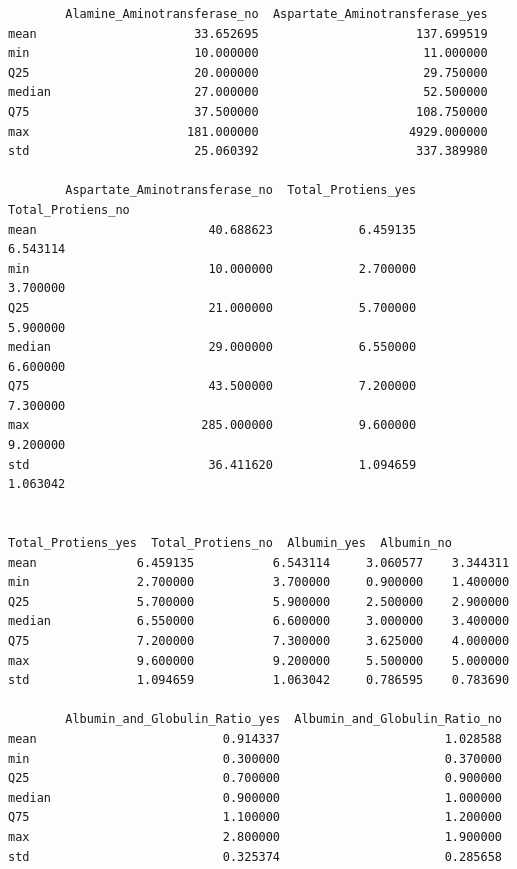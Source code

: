 \documentclass[
  11pt,
  a4paper,
]{article}
\begin{document}
\begin{verbatim}
        Alamine_Aminotransferase_no  Aspartate_Aminotransferase_yes  
mean                      33.652695                      137.699519   
min                       10.000000                       11.000000   
Q25                       20.000000                       29.750000   
median                    27.000000                       52.500000   
Q75                       37.500000                      108.750000   
max                      181.000000                     4929.000000   
std                       25.060392                      337.389980   

        Aspartate_Aminotransferase_no  Total_Protiens_yes  Total_Protiens_no  
mean                        40.688623            6.459135           6.543114   
min                         10.000000            2.700000           3.700000   
Q25                         21.000000            5.700000           5.900000   
median                      29.000000            6.550000           6.600000   
Q75                         43.500000            7.200000           7.300000   
max                        285.000000            9.600000           9.200000   
std                         36.411620            1.094659           1.063042 


Total_Protiens_yes  Total_Protiens_no  Albumin_yes  Albumin_no  
mean              6.459135           6.543114     3.060577    3.344311   
min               2.700000           3.700000     0.900000    1.400000   
Q25               5.700000           5.900000     2.500000    2.900000   
median            6.550000           6.600000     3.000000    3.400000   
Q75               7.200000           7.300000     3.625000    4.000000   
max               9.600000           9.200000     5.500000    5.000000   
std               1.094659           1.063042     0.786595    0.783690   

        Albumin_and_Globulin_Ratio_yes  Albumin_and_Globulin_Ratio_no  
mean                          0.914337                       1.028588  
min                           0.300000                       0.370000  
Q25                           0.700000                       0.900000  
median                        0.900000                       1.000000  
Q75                           1.100000                       1.200000  
max                           2.800000                       1.900000  
std                           0.325374                       0.285658 
\end{verbatim}

\vspace{0.2cm}
\end{document}
